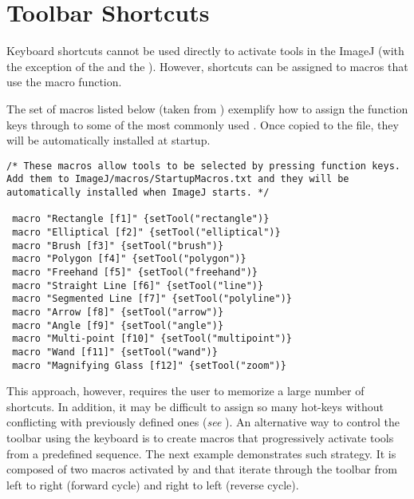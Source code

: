 
\endgroup


\section{Toolbar Shortcuts\label{sub:Tools-shortcuts}}

Keyboard shortcuts cannot be used directly to activate tools in the
ImageJ  (with the exception of the 
and the ). However, shortcuts can be
assigned to macros that use the 
macro function. 

The set of macros listed below (taken from )
exemplify  how to assign the function keys  through
 to some of the most commonly used .
Once copied to the 
file, they will be automatically installed at startup.

\begin{lstlisting}[caption={[Assigning Keyboard Shortcuts to ImageJ Tools]Assigning Keyboard Shortcuts to ImageJ Tools},label={lis:toolsShrtct1},showstringspaces=false,tabsize=4]
/* These macros allow tools to be selected by pressing function keys. Add them to ImageJ/macros/StartupMacros.txt and they will be automatically installed when ImageJ starts. */

 macro "Rectangle [f1]" {setTool("rectangle")}
 macro "Elliptical [f2]" {setTool("elliptical")}
 macro "Brush [f3]" {setTool("brush")}
 macro "Polygon [f4]" {setTool("polygon")}
 macro "Freehand [f5]" {setTool("freehand")}
 macro "Straight Line [f6]" {setTool("line")}
 macro "Segmented Line [f7]" {setTool("polyline")}
 macro "Arrow [f8]" {setTool("arrow")}
 macro "Angle [f9]" {setTool("angle")}
 macro "Multi-point [f10]" {setTool("multipoint")}
 macro "Wand [f11]" {setTool("wand")}
 macro "Magnifying Glass [f12]" {setTool("zoom")}
\end{lstlisting}


This approach, however, requires the user to memorize a large number
of shortcuts. In addition, it may be difficult to assign so many hot-keys
without conflicting with previously defined ones (\emph{see} ).
An alternative way to control the toolbar using the keyboard is to
create macros that progressively activate tools from a predefined
sequence. The next example demonstrates such strategy. It is composed
of two macros activated by  and 
that iterate through the toolbar from left to right (forward cycle)
and right to left (reverse cycle). 

